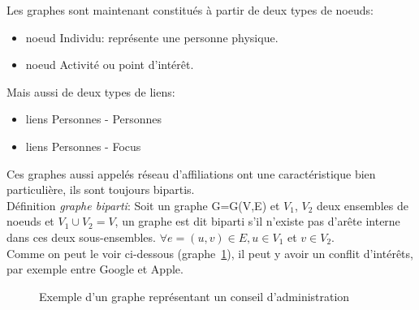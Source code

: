 Les graphes sont maintenant constitués à partir de deux types de noeuds:
\begin{itemize}
\item noeud Individu: représente une personne physique.
\item noeud Activité ou point d'intérêt. \\
\end{itemize}

Mais aussi de deux types de liens:
\begin{itemize}
\item liens Personnes - Personnes
\item liens Personnes - Focus
\end{itemize}

Ces graphes aussi appelés réseau d'affiliations ont une caractéristique bien particulière, ils sont toujours bipartis.\\

Définition \textit{graphe biparti}: Soit un graphe G=G(V,E) et $V_{1}$, $V_{2}$ deux ensembles de noeuds et $ V_{1} \cup V_{2} = V $, un graphe est dit biparti s'il n'existe pas d'arête interne dans ces deux sous-ensembles. $ \forall e = (u,v)\in E, u \in V_{1}$ et $v \in V_{2} $.\\

Comme on peut le voir ci-dessous (graphe~\ref{graph:grapheGoogle}), il peut y avoir un conflit d'intérêts, par exemple entre Google et Apple.

\begin{figure}[h!]
\centering
{}
\caption{Exemple d'un graphe représentant un conseil d'administration}

\label{graph:grapheGoogle}
\end{figure}

